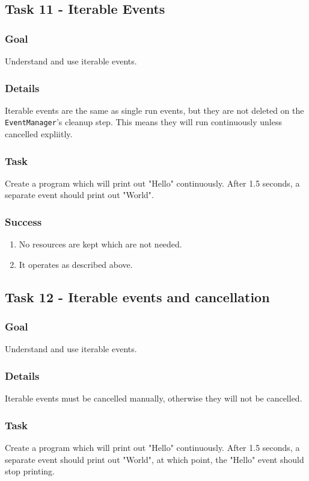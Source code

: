 \documentclass[a4paper]{article}
\begin{document}
\subsection{Task 11 - Iterable Events}
\subsubsection{Goal} Understand and use iterable events.
\subsubsection{Details} Iterable events are the same as single run events, but they are not deleted on the \lstinline{EventManager}'s cleanup step. This means they will run continuously unless cancelled expliitly.
\subsubsection{Task} Create a program which will print out "Hello" continuously. After 1.5 seconds, a separate event should print out "World". 
\subsubsection{Success} \begin{enumerate}\item{No resources are kept which are not needed.}\item{It operates as described above.}\end{enumerate}

\subsection{Task 12 - Iterable events and cancellation}
\subsubsection{Goal} Understand and use iterable events.
\subsubsection{Details} Iterable events must be cancelled manually, otherwise they will not be cancelled.
\subsubsection{Task} Create a program which will print out "Hello" continuously. After 1.5 seconds, a separate event should print out "World", at which point, the "Hello" event should stop printing. 
\end{document}
